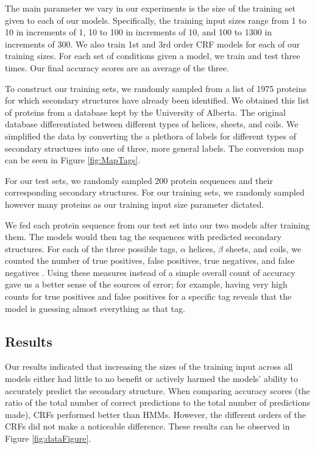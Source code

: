 \documentclass[11 pt, twocolumn]{article}
\begin{document}
The main parameter we vary in our experiments is the size of the training set given to each of our models.
Specifically, the training  input sizes range from 1 to 10 in increments of 1, 10 to 100 in increments of 10, and 100 to 1300 in increments of 300. We also train 1st and 3rd order CRF models for each of our training sizes. For each set of conditions given a model, we train and test three times. Our final accuracy scores are an average of the three. 

To construct our training sets, we randomly sampled from a list of 1975 proteins for which secondary structures have already been identified.  We obtained this list of proteins from  a database kept by the University of Alberta\cite{Zhang}. The original database differentiated between different types of helices, sheets, and coils. We simplified the data by converting the a plethora of labels for different types of secondary structures into one of three, more general labels. The conversion map can be seen in Figure \ref{fig:MapTags}. 

For our test sets, we randomly sampled 200 protein sequences and their corresponding secondary structures. For our training sets, we randomly sampled however many proteins as our training input size parameter dictated. 


We fed each protein sequence from our test set into our two models after training them. The models would then tag the sequences with predicted secondary structures. For each of the three possible tags, $\alpha$ helices, $\beta$ sheets, and coils, we counted the number of  true positives, false positives, true negatives, and false negatives . Using these measures instead of a simple overall count of accuracy gave us a better sense of  the sources of error; for example, having very high counts for true positives and false positives for a specific tag reveals that the model is guessing  almost everything as that tag.



\subsection{Results}

Our results indicated that increasing the sizes of the training input across all models either had little to no benefit or actively harmed the models' ability to accurately predict the secondary structure. When comparing accuracy scores (the ratio of the total number of correct predictions to the total number of predictions made), CRFs performed better than HMMs. However, the different orders of the CRFs did not make a noticeable difference. These results can be observed in Figure \ref{fig:dataFigure}.
\end{document}
